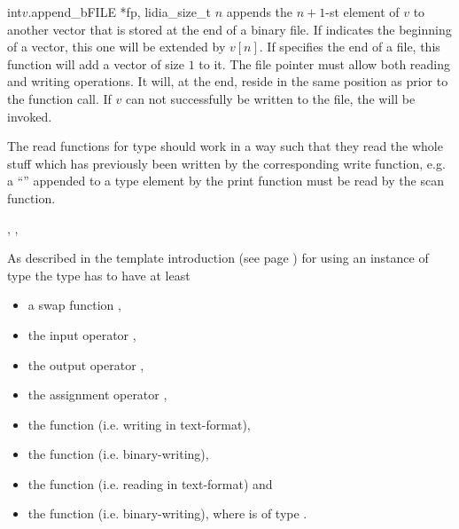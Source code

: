 \begin{cfcode}{int}{$v$.append_b}{FILE *fp, lidia_size_t $n$}
  appends the $n+1$-st element of $v$ to another vector that is stored at the end of a binary
  file.  If  indicates the beginning of a vector, this one will be extended by $v[n]$.
  If  specifies the end of a file, this function will add a vector of size $1$ to it.
  The file pointer must allow both reading and writing operations.  It will, at the end, reside
  in the same position as prior to the function call.  If $v$ can not successfully be written to
  the file, the \LEH will be invoked.
\end{cfcode}




The read functions for type  should work in a way such that they read the whole stuff
which has previously been written by the corresponding write function, e.g. a ``'' appended to a type  element by the print function must be read by the scan
function.



\SEEALSO

, ,



\NOTES

As described in the template introduction (see page \pageref{template_introduction}) for using
an instance of type  the type  has to have at least
\begin{itemize}
\item a swap function ,
\item the input operator \code{>>},
\item the output operator \code{<<},
\item the assignment operator \code{=},
\item the function  (i.e. writing in text-format),
\item the function  (i.e. binary-writing),
\item the function  (i.e. reading in text-format)
and
\item the function  (i.e. binary-writing), where  is of type
  .
\end{itemize}


